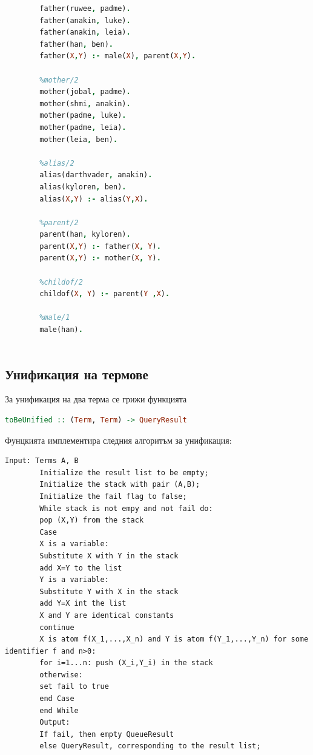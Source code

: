 \documentclass[15pt]{extarticle}
\begin{document}
	\begin{lstlisting}[language=Prolog,numbers=right]
		%father/2
		father(ruwee, padme).
		father(anakin, luke).
		father(anakin, leia).
		father(han, ben).
		father(X,Y) :- male(X), parent(X,Y).
		
		%mother/2
		mother(jobal, padme).
		mother(shmi, anakin).
		mother(padme, luke).
		mother(padme, leia).
		mother(leia, ben).
		
		%alias/2
		alias(darthvader, anakin).
		alias(kyloren, ben).
		alias(X,Y) :- alias(Y,X).
		
		%parent/2
		parent(han, kyloren).
		parent(X,Y) :- father(X, Y).
		parent(X,Y) :- mother(X, Y).
		
		%childof/2
		childof(X, Y) :- parent(Y ,X).
		
		%male/1
		male(han).
		
	\end{lstlisting}
	
	\subsection{Унификация на термове}
	
	За унификация на два терма се грижи функцията
	
	\begin{lstlisting}[language=haskell]
		toBeUnified :: (Term, Term) -> QueryResult
	\end{lstlisting}
	
	Фунцкията имплементира следния алгоритъм за унификация:
	
	\begin{lstlisting}[numbers=right]
		Input: Terms A, B
		Initialize the result list to be empty;
		Initialize the stack with pair (A,B);
		Initialize the fail flag to false;
		While stack is not empy and not fail do:
		pop (X,Y) from the stack
		Case
		X is a variable:
		Substitute X with Y in the stack
		add X=Y to the list
		Y is a variable:
		Substitute Y with X in the stack
		add Y=X int the list
		X and Y are identical constants 
		continue
		X is atom f(X_1,...,X_n) and Y is atom f(Y_1,...,Y_n) for some identifier f and n>0:
		for i=1...n: push (X_i,Y_i) in the stack
		otherwise:
		set fail to true
		end Case
		end While
		Output:
		If fail, then empty QueueResult
		else QueryResult, corresponding to the result list;
		
	\end{lstlisting}
\end{document}
